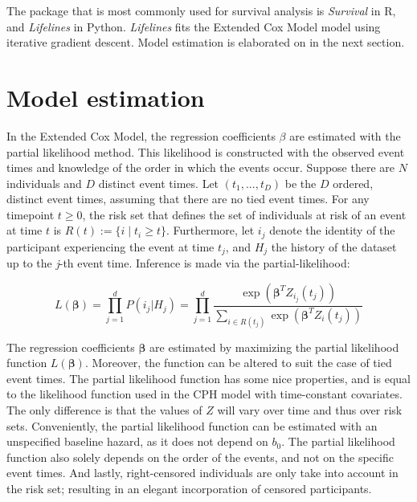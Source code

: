 The package that is most commonly used for survival analysis is \textit{Survival} in R, and \textit{Lifelines} in Python. \textit{Lifelines} fits the Extended Cox Model model using iterative gradient descent. Model estimation is elaborated on in the next section. 


\section{Model estimation}
\label{section:methodology:model_estimation}
In the Extended Cox Model, the regression coefficients $\beta$ are estimated with the partial likelihood method. This likelihood is constructed with the observed event times and knowledge of the order in which the events occur. Suppose there are $N$ individuals and $D$ distinct event times. Let $(t_1, ..., t_D)$ be the $D$ ordered, distinct event times, assuming that there are no tied event times. For any timepoint $t \geq 0$, the risk set that defines the set of individuals at risk of an event at time $t$ is $R(t) := \{i \mid t_i \geq t\}$. Furthermore, let $i_j$ denote the identity of the participant experiencing the event at time $t_j$, and $H_j$ the history of the dataset up to the \textit{j}-th event time. Inference is made via the partial-likelihood: 

$$L(\boldsymbol{\beta}) = \prod_{j=1}^{d}P(i_j | H_j) = \prod_{j=1}^{d} \frac{\exp(\boldsymbol{\beta}^T Z_{i_j}(t_j))}{\sum_{i \in R(t_j)} \exp(\boldsymbol{\beta}^T Z_{i}(t_j))}$$

The regression coefficients $\boldsymbol{\beta}$ are estimated by maximizing the partial likelihood function $L(\boldsymbol{\beta})$. Moreover, the function can be altered to suit the case of tied event times. The partial likelihood function has some nice properties, and is equal to the likelihood function used in the CPH model with time-constant covariates. The only difference is that the values of $Z$ will vary over time and thus over risk sets. Conveniently, the partial likelihood function can be estimated with an unspecified baseline hazard, as it does not depend on $b_0$. The partial likelihood function also solely depends on the order of the events, and not on the specific event times. And lastly, right-censored individuals are only take into account in the risk set; resulting in an elegant incorporation of censored participants. 

